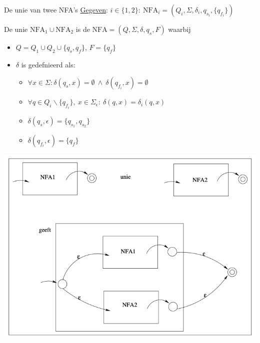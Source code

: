 \begin{pro}{De unie van twee NFA's}
    \underline{Gegeven}: $i \in \{1,2\}: \ \text{NFA}_i = (Q_i,\Sigma, \delta_i, q_{s_i}, \{q_{f_i}\})$ \\
    

    \begin{minipage}{.6\textwidth}
        De unie $\text{NFA}_1 \cup \text{NFA}_2$ is de $\text{NFA} = (Q,\Sigma, \delta, q_s, F)$ waarbij 
        \begin{itemize}
            \item $Q = Q_1 \cup Q_2 \cup \{ q_s, q_f \}$, $F = \{q_f\}$
            \item $\delta$  is gedefnieerd als:
            \begin{itemize}
                \item $\forall x \in \Sigma: \delta(q_s, x) = \emptyset \ \land \ \delta(q_{f_{i}}, x) = \emptyset$
                \item $\forall q \in Q_{i} \backslash \{q_{f_{i}}\}, \ x \in \Sigma_{\epsilon}: \ \delta(q,x) = \delta_i(q,x)$
                \item $\delta(q_s, \epsilon) = \{q_{s_{1}}, q_{s_{2}}\}$
                \item $\delta(q_{f_{i}}, \epsilon) = \{q_f\}$
            \end{itemize}
        \end{itemize}
    \end{minipage}
    \begin{minipage}{.36\textwidth}
        \includegraphics[scale = 0.225]{Images/UnieNFA}
    \end{minipage}
\end{pro}


